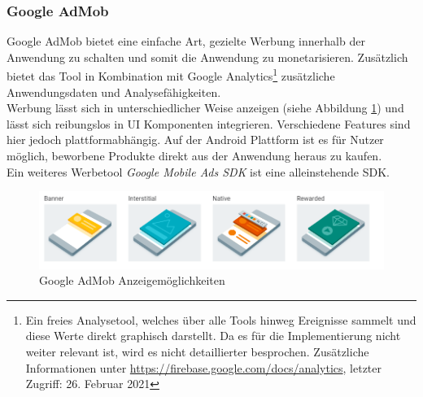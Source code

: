 \subsubsection{Google AdMob}
Google AdMob bietet eine einfache Art, gezielte Werbung innerhalb der Anwendung zu schalten und somit die Anwendung zu monetarisieren.
Zusätzlich bietet das Tool in Kombination mit Google Analytics\footnote{Ein freies Analysetool, welches über alle Tools hinweg Ereignisse sammelt und diese Werte direkt graphisch darstellt. Da es für die Implementierung nicht weiter relevant ist, wird es nicht detaillierter besprochen. Zusätzliche Informationen unter \url{https://firebase.google.com/docs/analytics}, letzter Zugriff: 26. Februar 2021} zusätzliche Anwendungsdaten und Analysefähigkeiten.\\
Werbung lässt sich in unterschiedlicher Weise anzeigen (siehe Abbildung \ref{fig:firebase_admob}) und lässt sich reibungslos in UI Komponenten integrieren. 
Verschiedene Features sind hier jedoch plattformabhängig. 
Auf der Android Plattform ist es für Nutzer möglich, beworbene Produkte direkt aus der Anwendung heraus zu kaufen.\\
Ein weiteres Werbetool \textit{Google Mobile Ads SDK} ist eine alleinstehende SDK.\cite{firebase2021}

\begin{figure}[tbt]
	\begin{center}
		\includegraphics[scale=0.55]{Theoretische_Grundlagen/images/firebase_admob_ads.PNG}
	\end{center}
	\caption{Google AdMob Anzeigemöglichkeiten}
	\label{fig:firebase_admob}
\end{figure}




































